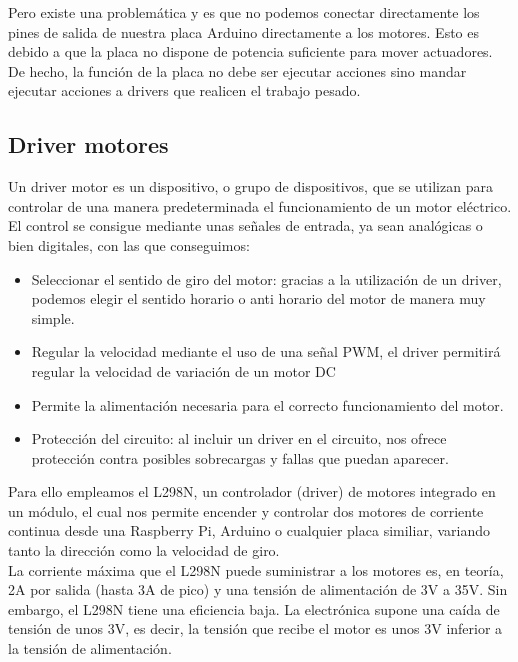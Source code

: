 Pero existe una problemática y es que no podemos conectar directamente los pines de salida de nuestra placa Arduino directamente a los motores. Esto es debido a
que la placa no dispone de potencia suficiente para mover actuadores. De hecho, la función de la placa no debe ser ejecutar acciones sino mandar ejecutar acciones a drivers que
realicen el trabajo pesado.\\

\subsection{Driver motores}

Un driver motor es un dispositivo, o grupo de dispositivos, que se utilizan para controlar de una manera predeterminada el funcionamiento de un motor eléctrico. El control 
se consigue mediante unas señales de entrada, ya sean analógicas o bien digitales, con las que 
conseguimos:

\begin{itemize}
 \item Seleccionar el sentido de giro del motor: gracias a la utilización de un driver, podemos 
elegir el sentido horario o anti horario del motor de manera muy simple.
\item Regular la velocidad mediante el uso de una señal PWM, el driver permitirá regular la velocidad de variación de un motor DC
\item Permite la alimentación necesaria para el correcto funcionamiento del motor.
\item Protección del circuito: al incluir un driver en el circuito, nos ofrece protección contra 
posibles sobrecargas y fallas que puedan aparecer.
\end{itemize}

Para ello empleamos el L298N, un controlador (driver) de motores integrado en un módulo, el cual nos permite encender y controlar dos motores de corriente continua desde una Raspberry Pi, Arduino o
cualquier placa similiar, variando tanto la dirección como la velocidad de giro.\\

La corriente máxima que el L298N puede suministrar a los motores es, en teoría, 2A por salida (hasta 3A de pico) y una tensión de alimentación de 3V a 35V. Sin embargo, el L298N tiene una 
eficiencia baja. La electrónica supone una caída de tensión de unos 3V, es decir, la tensión que recibe el motor es unos 3V inferior a la tensión de alimentación.\\

